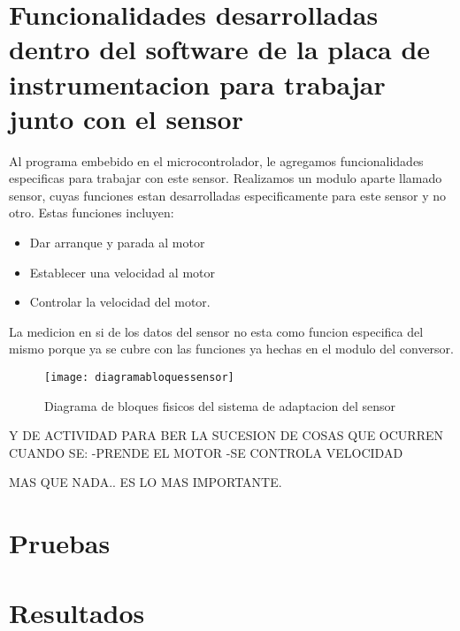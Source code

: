 


\section{Funcionalidades desarrolladas dentro del software de la placa de instrumentacion para trabajar junto con el sensor} %
\label{sec:funcionalidades_desarrolladas_dentro_del_software_de_la_placa_de_instrumentacion_para_trabajar_junto_con_el_sensor}

Al programa embebido en el microcontrolador, le agregamos funcionalidades especificas para trabajar con este sensor. Realizamos un modulo aparte llamado sensor, cuyas funciones estan desarrolladas especificamente para este sensor y no otro. Estas funciones incluyen:

\begin{itemize}
	\item Dar arranque y parada al motor
	\item Establecer una velocidad al motor
	\item Controlar la velocidad del motor.
\end{itemize}

La medicion en si de los datos del sensor no esta como funcion especifica del mismo porque ya se cubre con las funciones ya hechas en el modulo del conversor.

\begin{figure}[h]
  \centering
  \texttt{[image: diagramabloquessensor]}
  \caption{Diagrama de bloques fisicos del sistema de adaptacion del sensor}\label{fig:diagramabloquessensor}
\end{figure}

Y DE ACTIVIDAD PARA BER LA SUCESION DE COSAS QUE OCURREN CUANDO SE:
-PRENDE EL MOTOR
-SE CONTROLA VELOCIDAD

MAS QUE NADA.. ES LO MAS IMPORTANTE.


\section{Pruebas} %
\label{sec:pruebas}


\section{Resultados} %
\label{sec:resultados}


